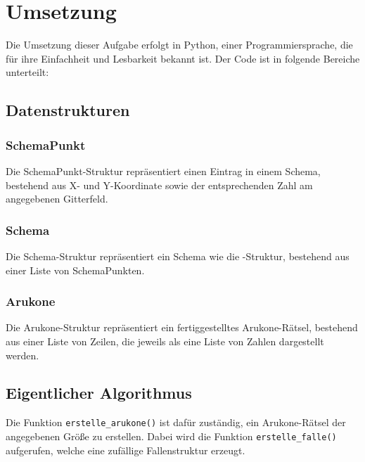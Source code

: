 \section{Umsetzung}
Die Umsetzung dieser Aufgabe erfolgt in Python, einer Programmiersprache, die für ihre Einfachheit und Lesbarkeit bekannt ist.
Der Code ist in folgende Bereiche unterteilt:

\subsection{Datenstrukturen}
\subsubsection*{SchemaPunkt}
Die SchemaPunkt-Struktur repräsentiert einen Eintrag in einem Schema, bestehend aus X- und Y-Koordinate sowie der entsprechenden Zahl am angegebenen Gitterfeld.

\subsubsection*{Schema}
Die Schema-Struktur repräsentiert ein Schema wie die \grqq-Struktur, bestehend aus einer Liste von SchemaPunkten.

\subsubsection*{Arukone}
Die Arukone-Struktur repräsentiert ein fertiggestelltes Arukone-Rätsel, bestehend aus einer Liste von Zeilen, die jeweils als eine Liste von Zahlen dargestellt werden.

\subsection{Eigentlicher Algorithmus}
Die Funktion \texttt{erstelle\_arukone()} ist dafür zuständig, ein Arukone-Rätsel der angegebenen Größe zu erstellen.
Dabei wird die Funktion \texttt{erstelle\_falle()} aufgerufen, welche eine zufällige Fallenstruktur erzeugt.

